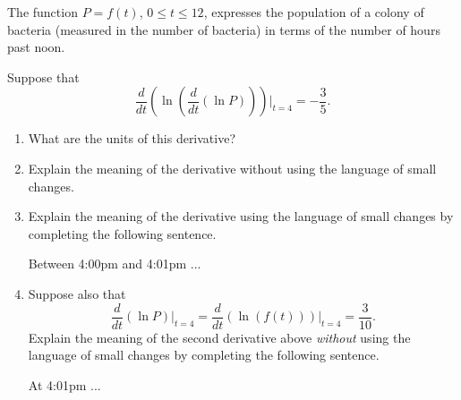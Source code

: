 \documentclass{ximera}
\begin{document}
\begin{question}  \label{Q54356dfdfgng}
The function $P=f(t)$, $0\leq t \leq 12$, expresses the population of a colony of bacteria (measured in the number of bacteria) in terms of the number of hours past noon.

Suppose that
\begin{equation}
   \frac{d}{dt} \left( \ln \left(  \frac{d}{dt} \left( \ln P \right)  \right) \right) \Big|_{t=4} =  -\frac{3}{5} .  %
\end{equation}


\begin{enumerate}
\item What are the units of this derivative?

\item Explain the meaning of the derivative without using the language of small changes.

\item Explain the meaning of the derivative using the language of small changes by completing the following sentence.

Between 4:00pm and 4:01pm  ...

\item Suppose also that
\[
   \frac{d}{dt} \left(  \ln P \right)\Big|_{t=4} = \frac{d}{dt} \left(  \ln (f(t)) \right)\Big|_{t=4}  = \frac{3}{10} .
\]
Explain the meaning of the second derivative above \emph{without} using the language of small changes by completing the following sentence.

At 4:01pm  ...

\end{enumerate}
\end{question}
\end{document}
